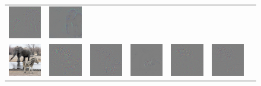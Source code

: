 \begin{figure}
\begin{center}
\begin{tabular}{ccccccc}
\includegraphics[width=0.14\linewidth,height=0.115\linewidth]{figs/examples/googlenet/deconv/zeb-ele1_diff_387} &
\includegraphics[width=0.14\linewidth,height=0.115\linewidth]{figs/examples/googlenet/soft/zeb-ele1_diff_387} \\
\includegraphics[width=0.14\linewidth,height=0.115\linewidth]{figs/examples/googlenet/oxford/zeb-ele2} &
\includegraphics[width=0.14\linewidth,height=0.115\linewidth]{figs/examples/googlenet/oxford/zeb-ele2_diff_341} &
\includegraphics[width=0.14\linewidth,height=0.115\linewidth]{figs/examples/googlenet/deconv/zeb-ele2_diff_341} &
\includegraphics[width=0.14\linewidth,height=0.115\linewidth]{figs/examples/googlenet/soft/zeb-ele2_diff_341} &
\includegraphics[width=0.14\linewidth,height=0.115\linewidth]{figs/examples/googlenet/oxford/zeb-ele2_diff_387} &
\includegraphics[width=0.14\linewidth,height=0.115\linewidth]{figs/examples/googlenet/deconv/zeb-ele2_diff_387} &

\end{tabular}
\end{center}
\end{figure}
